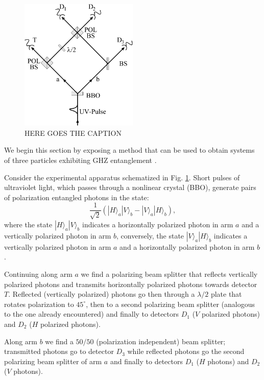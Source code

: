 \begin{figure}
  \centering
  \includegraphics[width=0.5\textwidth]{Mainmatter/Chapter3/ghz-entanglement.png}
  \caption{HERE GOES THE CAPTION}
  \label{fig:ghz-entanglement}
\end{figure}

We begin this section by exposing a method that can be used to obtain systems of three particles exhibiting GHZ entanglement \cite{PhysRevLett.82.1345}.

Consider the experimental apparatus schematized in Fig. \ref{fig:ghz-entanglement}. Short pulses of ultraviolet light, which passes through a nonlinear crystal (BBO), generate pairs of polarization entangled photons in the state:
\begin{equation}
  \frac{1}{\sqrt{2}} \left( |H\rangle_a |V\rangle_b - |V\rangle_a |H\rangle_b \right),
\end{equation}
where the state $|H\rangle_a |V\rangle_b$ indicates a horizontally polarized photon in arm $a$ and a vertically polarized photon in arm $b$, conversely, the state $|V\rangle_a |H\rangle_b$ indicates a vertically polarized photon in arm $a$ and a horizontally polarized photon in arm $b$.

Continuing along arm $a$ we find a polarizing beam splitter that reflects vertically polarized photons and transmits horizontally polarized photons towards detector $T$. Reflected (vertically polarized) photons go then through a $\lambda/2$ plate that rotates polarization to $45^\circ$, then to a second polarizing beam splitter (analogous to the one already encountered) and finally to detectors $D_1$ ($V$ polarized photons) and $D_2$ ($H$ polarized photons).

Along arm $b$ we find a $50/50$ (polarization independent) beam splitter; transmitted photons go to detector $D_3$ while reflected photons go the second polarizing beam splitter of arm $a$ and finally to detectors $D_1$ ($H$ photons) and $D_2$ ($V$ photons).

